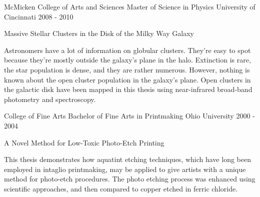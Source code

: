 

\begin{cventries}

  \cventry
    {McMicken College of Arts and Sciences} %
    {Master of Science in Physics} %
    {University of Cincinnati} %
    {2008 - 2010} %
    {
    \begin{cvcompactparagraph}
      Massive Stellar Clusters in the Disk of the Milky Way Galaxy
    \end{cvcompactparagraph}
    \begin{cvabstractparagraph}
      Astronomers have a lot of information on globular clusters. They're easy to spot because they're mostly outside the galaxy's plane in the halo. Extinction is rare, the star population is dense, and they are rather numerous. However, nothing is known about the open cluster population in the galaxy's plane. Open clusters in the galactic disk have been mapped in this thesis using near-infrared broad-band photometry and spectroscopy.
    \end{cvabstractparagraph}
    }

  \cventry
    {College of Fine Arts} %
    {Bachelor of Fine Arts in Printmaking} %
    {Ohio University} %
    {2000 - 2004} %
    {
    \begin{cvcompactparagraph}
      A Novel Method for Low-Toxic Photo-Etch Printing
    \end{cvcompactparagraph}
    \begin{cvabstractparagraph}
      This thesis demonstrates how aquatint etching techniques, which have long been employed in intaglio printmaking, may be applied to give artists with a unique method for photo-etch procedures. The photo etching process was enhanced using scientific approaches, and then compared to copper etched in ferric chloride.
    \end{cvabstractparagraph}
    }
\end{cventries}
